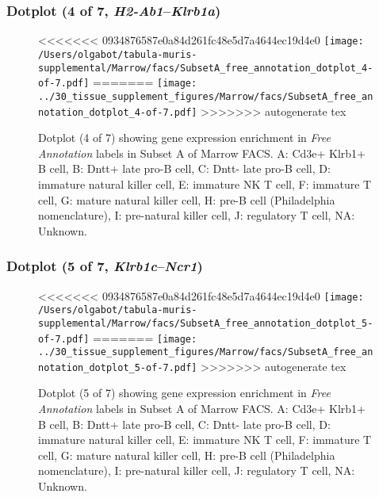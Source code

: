 \subsubsection{Dotplot (4 of 7, \emph{H2-Ab1}--\emph{Klrb1a})}
\begin{figure}[h]
\centering
<<<<<<< 0934876587e0a84d261fc48e5d7a4644ec19d4e0
\texttt{[image: /Users/olgabot/tabula-muris-supplemental/Marrow/facs/SubsetA\_free\_annotation\_dotplot\_4-of-7.pdf]}
=======
\texttt{[image: ../30\_tissue\_supplement\_figures/Marrow/facs/SubsetA\_free\_annotation\_dotplot\_4-of-7.pdf]}
>>>>>>> autogenerate tex

\caption{ Dotplot (4 of 7)  showing gene expression enrichment in \emph{Free Annotation} labels in Subset A of Marrow FACS. A: Cd3e+ Klrb1+ B cell, B: Dntt+ late pro-B cell, C: Dntt- late pro-B cell, D: immature natural killer cell, E: immature NK T cell, F: immature T cell, G: mature natural killer cell, H: pre-B cell (Philadelphia nomenclature), I: pre-natural killer cell, J: regulatory T cell, NA: Unknown.}
\end{figure}


\clearpage

\subsubsection{Dotplot (5 of 7, \emph{Klrb1c}--\emph{Ncr1})}
\begin{figure}[h]
\centering
<<<<<<< 0934876587e0a84d261fc48e5d7a4644ec19d4e0
\texttt{[image: /Users/olgabot/tabula-muris-supplemental/Marrow/facs/SubsetA\_free\_annotation\_dotplot\_5-of-7.pdf]}
=======
\texttt{[image: ../30\_tissue\_supplement\_figures/Marrow/facs/SubsetA\_free\_annotation\_dotplot\_5-of-7.pdf]}
>>>>>>> autogenerate tex

\caption{ Dotplot (5 of 7)  showing gene expression enrichment in \emph{Free Annotation} labels in Subset A of Marrow FACS. A: Cd3e+ Klrb1+ B cell, B: Dntt+ late pro-B cell, C: Dntt- late pro-B cell, D: immature natural killer cell, E: immature NK T cell, F: immature T cell, G: mature natural killer cell, H: pre-B cell (Philadelphia nomenclature), I: pre-natural killer cell, J: regulatory T cell, NA: Unknown.}
\end{figure}


\clearpage

